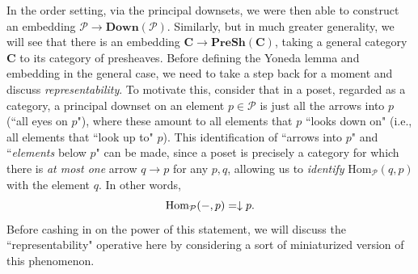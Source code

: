 \documentclass[11pt]{book}
\theoremstyle{definition}
\theoremstyle{definition}
\theoremstyle{definition}
\theoremstyle{theorem}
\theoremstyle{definition}
\begin{document}
In the order setting, via the principal downsets, we were then able to construct an embedding $\mathcal{P} \rightarrow \textbf{Down}(\mathcal{P})$. Similarly, but in much greater generality, we will see that there is an embedding $\textbf{C} \rightarrow \textbf{PreSh}(\textbf{C})$, taking a general category $\textbf{C}$ to its category of presheaves. Before defining the Yoneda lemma and embedding in the general case, we need to take a step back for a moment and discuss \textit{representability}. To motivate this, consider that in a poset, regarded as a category, a principal downset on an element $p \in \mathcal{P}$ is just all the arrows into $p$ (``all eyes on $p$"), where these amount to all elements that $p$ ``looks down on" (i.e., all elements that ``look up to" $p$). This identification of ``arrows into $p$" and ``\textit{elements} below $p$" can be made, since a poset is precisely a category for which there is \textit{at most one} arrow $q \rightarrow p$ for any $p, q$, allowing us to \textit{identify} $\text{Hom}_{\mathcal{P}}(q, p)$ with the element $q$. In other words, 
\begin{equation*} 
\text{Hom}_{\mathcal{P}}(\--, p) = \downarrow p . 
\end{equation*} 
Before cashing in on the power of this statement, we will discuss the ``representability" operative here by considering a sort of miniaturized version of this phenomenon. 
\end{document}
